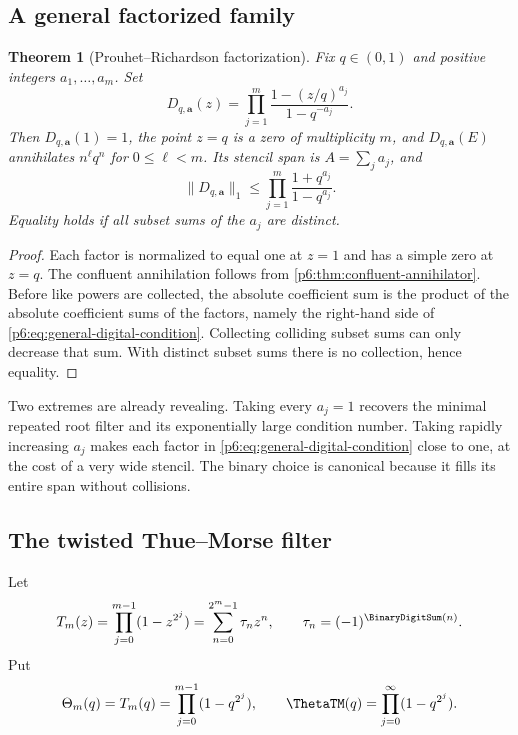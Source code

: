 \documentclass[11pt]{article}
\numberwithin{equation}{section}
\newtheorem{theorem}{Theorem}[section]
\theoremstyle{definition}
\theoremstyle{remark}
\begin{document}
\subsection{A general factorized family}

\begin{theorem}[Prouhet--Richardson factorization]
\label{p6:thm:general-digital}
Fix $q\in(0,1)$ and positive integers $a_1,\ldots,a_m$.  Set
\begin{equation}
 D_{q,\bm a}(z)
 =\prod_{j=1}^{m}
 \frac{1-(z/q)^{a_j}}{1-q^{-a_j}}.
 \label{p6:eq:general-digital-filter}
\end{equation}
Then $D_{q,\bm a}(1)=1$, the point $z=q$ is a zero of multiplicity $m$, and
$D_{q,\bm a}(E)$ annihilates $n^\ell q^n$ for $0\le\ell<m$.  Its stencil span is
$A=\sum_ja_j$, and
\begin{equation}
 \|D_{q,\bm a}\|_1
 \le\prod_{j=1}^{m}\frac{1+q^{a_j}}{1-q^{a_j}}.
 \label{p6:eq:general-digital-condition}
\end{equation}
Equality holds if all subset sums of the $a_j$ are distinct.
\end{theorem}

\begin{proof}
Each factor is normalized to equal one at $z=1$ and has a simple zero at $z=q$.
The confluent annihilation follows from \cref{p6:thm:confluent-annihilator}.  Before like
powers are collected, the absolute coefficient sum is the product of the absolute
coefficient sums of the factors, namely the right-hand side of
\eqref{p6:eq:general-digital-condition}.  Collecting colliding subset sums can only decrease
that sum.  With distinct subset sums there is no collection, hence equality.
\end{proof}

Two extremes are already revealing.  Taking every $a_j=1$ recovers the minimal repeated
root filter and its exponentially large condition number.  Taking rapidly increasing
$a_j$ makes each factor in \eqref{p6:eq:general-digital-condition} close to one, at the cost
of a very wide stencil.  The binary choice is canonical because it fills its entire span
without collisions.

\subsection{The twisted Thue--Morse filter}

Let
\begin{equation}
 T_m(z)=\prod_{j=0}^{m-1}(1-z^{2^j})
 =\sum_{n=0}^{2^m-1}\tau_nz^n,
 \qquad \tau_n=(-1)^{\BinaryDigitSum(n)}.
 \label{p6:eq:tm-polynomial}
\end{equation}
Put
\begin{equation}
 \Theta_m(q)=T_m(q)=\prod_{j=0}^{m-1}(1-q^{2^j}),
 \qquad
 \ThetaTM(q)=\prod_{j=0}^{\infty}(1-q^{2^j}).
 \label{p6:eq:tm-theta}
\end{equation}
\end{document}
